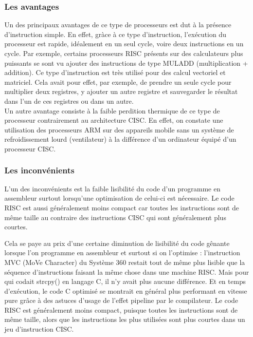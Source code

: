 \subsubsection{ Les avantages }

Un des principaux avantages de ce type de processeurs est dut à la présence d'instruction simple. En effet, gràce à ce type d'instruction, l'exécution du processeur est rapide, idéalement en un seul cycle, voire deux instructions en un cycle. Par exemple, certains processeurs RISC présents sur des calculateurs plus puissants se sont vu ajouter des instructions de type MULADD (multiplication + addition). Ce type d'instruction est très utilisé pour des calcul vectoriel et matriciel. Cela avait pour effet, par exemple, de prendre un seule cycle pour multiplier deux registres, y ajouter un autre registre et sauvegarder le résultat dans l'un de ces registres ou dans un autre.\\
Un autre avantage consiste à la faible perdition thermique de ce type de processeur contrairement au architecture CISC. En effet, on constate une utilisation des processeurs ARM sur des appareils mobile sans un système de refroidissement lourd (ventilateur) à la différence d'un ordinateur équipé d'un processeur CISC.

\subsubsection{ Les inconvénients}

L'un des inconvénients est la faible lisibilité du code d'un programme en assembleur surtout lorsqu'une optimisation de celui-ci est nécessaire.
Le code RISC est aussi généralement moins compact car toutes les instructions sont de même taille au contraire des instructions CISC qui sont généralement plus courtes.  


Cela se paye au prix d'une certaine diminution de lisibilité du code gênante lorsque l'on programme en assembleur et surtout si on l'optimise : l'instruction MVC (MoVe Character) du Système 360 restait tout de même plus lisible que la séquence d'instructions faisant la même chose dans une machine RISC. Mais pour qui codait strcpy() en langage C, il n'y avait plus aucune différence. Et en temps d'exécution, le code C optimisé se montrait en général plus performant en vitesse pure grâce à des astuces d'usage de l'effet pipeline par le compilateur.
Le code RISC est généralement moins compact, puisque toutes les instructions sont de même taille, alors que les instructions les plus utilisées sont plus courtes dans un jeu d'instruction CISC.

